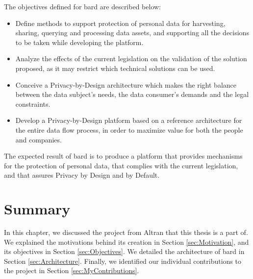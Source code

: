 The objectives defined for \ac{bard} are described below:

\begin{itemize}
	
	\item Define methods to support protection of personal data for harvesting, sharing, querying and processing data assets, and supporting all the decisions to be taken while developing the platform.
	\item Analyze the effects of the current legislation on the validation of the solution proposed, as it may restrict which technical solutions can be used.
	\item Conceive a Privacy-by-Design architecture which makes the right balance between the data subject’s needs, the data consumer’s demands and the legal constraints.
	\item Develop a Privacy-by-Design platform based on a reference architecture for the entire data flow process, in order to maximize value for both the people and companies.
\end{itemize}

The expected result of \ac{bard} is to produce a platform that provides mechanisms for the protection of personal data, that complies with the current legislation, and that assures Privacy by Design and by Default.





  
\section{Summary}
\label{sec:SummaryBARD}

In this chapter, we discussed the project from Altran that this thesis is a part of.
We explained the motivations behind its creation in Section \ref{sec:Motivation}, and its objectives in Section \ref{sec:Objectives}.
We detailed the architecture of \ac{bard} in Section \ref{sec:Architecture}.
Finally, we identified our individual contributions to the project in Section \ref{sec:MyContributions}.



